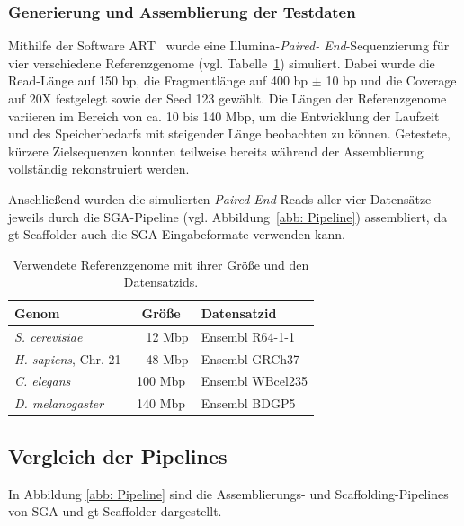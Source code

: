 \documentclass[a4paper,10pt,parskip]{scrartcl}
\begin{document}
\subsubsection*{Generierung und Assemblierung der Testdaten}
Mithilfe der Software ART~\cite{Huang:2012kq} wurde eine
Illumina-\textit{Paired- End}-Sequenzierung für vier verschiedene Referenzgenome
(vgl. Tabelle~\ref{tab: Referenzgenome}) simuliert. Dabei wurde die Read-Länge
auf 150 bp, die Fragmentlänge auf 400 bp $\pm$ 10 bp und die Coverage auf
20X festgelegt sowie der Seed 123 gewählt. Die Längen der Referenzgenome
variieren im Bereich von ca. 10 bis 140 Mbp, um die Entwicklung der Laufzeit
und des Speicherbedarfs mit steigender Länge beobachten zu können.
Getestete, kürzere Zielsequenzen konnten teilweise bereits während der
Assemblierung vollständig rekonstruiert werden.

Anschließend wurden die simulierten \textit{Paired-End}-Reads aller vier
Datensätze jeweils durch die SGA-Pipeline (vgl. Abbildung~\ref{abb: Pipeline})
assembliert, da gt Scaffolder auch die SGA Eingabeformate verwenden kann.

\begin{table}
  \centering
  \begin{tabular}{l | c | l}
    Genom & Größe & Datensatzid \\
    \hline
    \textit{S. cerevisiae} &~~12 Mbp & Ensembl R64-1-1 \\
    \textit{H. sapiens}, Chr. 21 &~~48 Mbp & Ensembl GRCh37 \\
    \textit{C. elegans} & 100 Mbp & Ensembl WBcel235 \\
    \textit{D. melanogaster} & 140 Mbp & Ensembl BDGP5
  \end{tabular}
  \caption{\label{tab: Referenzgenome} Verwendete Referenzgenome mit
    ihrer Größe und den Datensatzids.}
\end{table}

\subsection{Vergleich der Pipelines}

In Abbildung \ref{abb: Pipeline} sind die Assemblierungs- und
Scaffolding-Pipelines von SGA und gt Scaffolder dargestellt.
\end{document}
